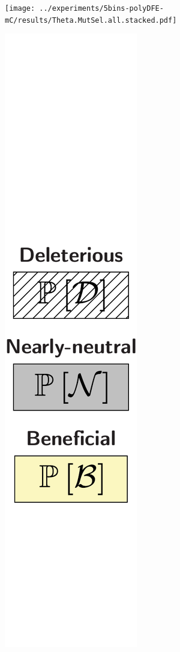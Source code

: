 \documentclass{article}
\begin{document}
    \begin{center}
        \begin{minipage}{0.9\linewidth}
            \texttt{[image: ../experiments/5bins-polyDFE-mC/results/Theta.MutSel.all.stacked.pdf]}
        \end{minipage}
        \begin{minipage}{0.09\linewidth}
            \includegraphics[width=\linewidth, page=1]{artworks/legend.polycat}

\end{minipage}
\end{center}
\end{document}
